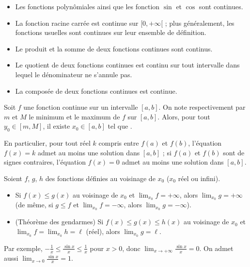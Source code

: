      \begin{prop}\vspace{-1\baselineskip}
      \begin{itemize}
            \item Les fonctions polyn\^omiales ainsi que les fonction $\sin$ et $\cos$ sont continues.
            \item La fonction racine carr\'ee est continue sur $[0,+\infty[$ ; plus g\'en\'eralement, les fonctions usuelles sont continues sur leur ensemble de d\'efinition.
            \item Le produit et la somme de deux fonctions continues sont continus.
            \item Le quotient de deux fonctions continues est continu sur tout intervalle dans lequel le d\'enominateur ne s'annule pas.
            \item La compos\'ee de deux fonctions continues est continue.
      \end{itemize}
      
      \end{prop}

      \begin{thm}
            Soit $f$ une fonction continue sur un intervalle $[a,b]$.
            On note respectivement par $m$ et $M$ le minimum et le maximum de $f$ sur $[a,b]$.
            Alors, pour tout $y_0\in[m,M]$, il existe $x_0\in[a,b]$ tel que .      

            En particulier, pour tout r\'eel $k$ compris entre $f(a)$ et $f(b)$, l'\'equation $f(x) = k$ admet au moins une solution dans $[a,b]$ ;
            si $f(a)$ et $f(b)$ sont de signes contraires, l'\'equation $f(x) = 0$ admet au moins une solution dans $[a,b]$.
      \end{thm}
      \begin{prop}
            Soient $f$, $g$, $h$ des fonctions d\'efinies au voisinage de $x_0$ ($x_0$ r\'eel ou infini).
            \begin{itemize}
                  \item Si $f(x) \leq g(x)$ au voisinage de $x_0$ et $\lim_{x_0} f = +\infty$, alors $\lim_{x_0} g = +\infty$
                        (de m\^eme, si $g \leq f$ et $\lim_{x_0} f = -\infty$, alors $\lim_{x_0} g = -\infty$).
                  \item (Th\'eor\`eme des gendarmes) Si $f(x) \leq g(x) \leq h(x)$ au voisinage de $x_0$ et
                        $\lim_{x_0} f = \lim_{x_0} h = \ell$ (r\'eel), alors $\lim_{x_0} g = \ell$.
            \end{itemize}
            Par exemple, $-\frac{1}{x} \leq \frac{\sin x}{x} \leq \frac{1}{x}$ pour $x > 0$, donc $\lim_{x\rightarrow+\infty} \frac{\sin x}{x} = 0$.
            On admet aussi $\lim_{x\rightarrow 0} \frac{\sin x}{x} = 1$.
      \end{prop}

